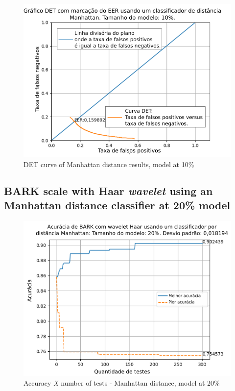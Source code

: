 \begin{figure}[!ht]
	\centering
	\includegraphics[width=\linewidth]{images/results/det/DET_for_classifier_Manhattan_10}
	\caption{DET curve of Manhattan distance results, model at 10\%}
	\label{fig:detforclassifiermanhattan10}
\end{figure}

\subsection{BARK scale with Haar \textit{wavelet} using an Manhattan distance classifier at 20\% model}



\begin{figure}[!ht]
	\centering
	\includegraphics[width=\linewidth]{images/results/confusionMatrices/classifier_Manhattan_20.png}
	\caption{Accuracy \textit{X} number of tests - Manhattan distance, model at 20\%}
	\label{fig:classifiermanhattan20}
\end{figure}

